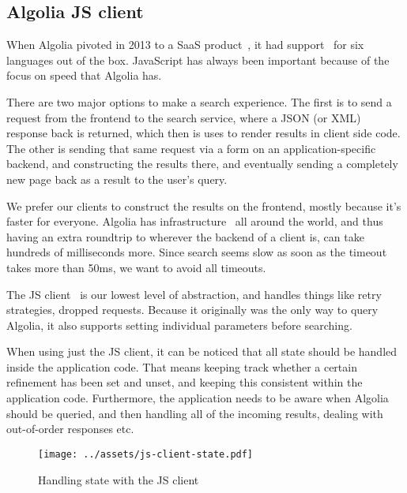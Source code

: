 \subsection{Algolia JS client} %
\label{sub:algolia_js_client}

When Algolia pivoted in 2013 to a SaaS product~\cite{algolia-blog-saas}, it had support~\cite{algolia-blog-lauch} for six languages out of the box. JavaScript has always been important because of the focus on speed that Algolia has.

There are two major options to make a search experience. The first is to send a request from the frontend to the search service, where a JSON (or XML) response back is returned, which then is uses to render results in client side code. The other is sending that same request via a form on an application-specific backend, and constructing the results there, and eventually sending a completely new page back as a result to the user's query.

We prefer our clients to construct the results on the frontend, mostly because it's faster for everyone. Algolia has infrastructure~\cite{algolia-infra} all around the world, and thus having an extra roundtrip to wherever the backend of a client is, can take hundreds of milliseconds more. Since search seems slow as soon as the timeout takes more than 50ms, we want to avoid all timeouts.

The JS client~\cite{algolia-js-client} is our lowest level of abstraction, and handles things like retry strategies, dropped requests. Because it originally was the only way to query Algolia, it also supports setting individual parameters before searching.

When using just the JS client, it can be noticed that all state should be handled inside the application code. That means keeping track whether a certain refinement has been set and unset, and keeping this consistent within the application code. Furthermore, the application needs to be aware when Algolia should be queried, and then handling all of the incoming results, dealing with out-of-order responses etc.

\begin{figure}[H]
\label{figure:js-client-state}
  \centering
  \texttt{[image: ../assets/js-client-state.pdf]}
  \caption{Handling state with the JS client}
\end{figure}


